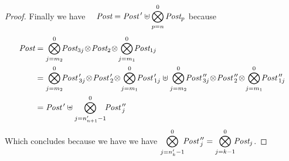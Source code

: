 \documentclass{lmcs}
\newcommand{\shortotimes}{\!\otimes\!}
\begin{document}
\begin{proof}
Finally we have~~
$\Post=\displaystyle{\Post\,' \uplus \bigotimes_{p=n}^0
		\Post_p}$\quad
because
{\small \begin{align*}
\Post&=\bigotimes_{j=m_2}^{0}\!\!\Post_{3j}\shortotimes\Post_2\shortotimes\bigotimes_{j=m_1}^{0}\!\!\Post_{1j}\\
&=\bigotimes_{j=m_2}^{0}\!\!\Post\,'_{3j}\shortotimes\Post\,'_2\shortotimes\bigotimes_{j=m_1}^{0}\!\!\Post\,'_{1j} \uplus \bigotimes_{j=m_2}^{0}\!\!\Post\,''_{3j}\shortotimes\Post\,''_2\shortotimes\bigotimes_{j=m_1}^{0}\!\!\Post\,''_{1j}\\
&=\Post\,' \uplus \bigotimes_{j=n'_{n+1}-1}^{0}\!\!\Post\,''_{j}
\end{align*}}
Which concludes because we have we have $\displaystyle{\bigotimes_{j=n'_{k}-1}^{0}\!\!\Post\,''_{j} = \bigotimes_{j=k-1}^{0}\!\!\Post_{j}}$.
%
%

\end{proof}
\end{document}
